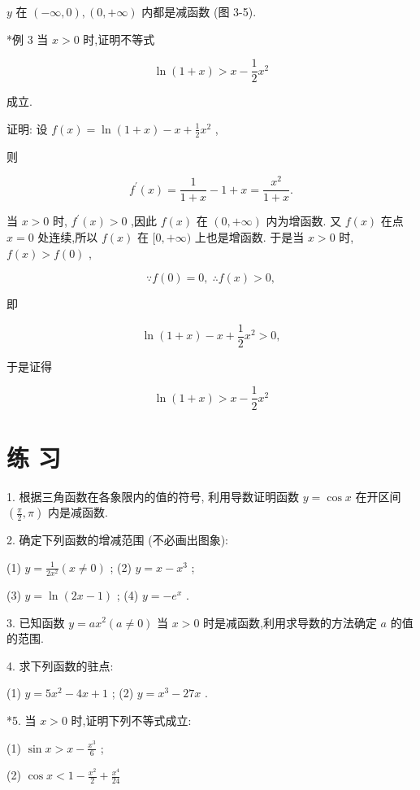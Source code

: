 \documentclass[10pt]{article}
\begin{document}
\(y\) 在 \(\left( {-\infty ,0}\right) ,\left( {0, + \infty }\right)\) 内都是减函数 (图 3-5).

*例 3 当 \(x > 0\) 时,证明不等式

\[
\ln \left( {1 + x}\right) > x - \frac{1}{2}{x}^{2}
\]

成立.

证明: 设 \(f\left( x\right) = \ln \left( {1 + x}\right) - x + \frac{1}{2}{x}^{2}\) ,

则

\[
{f}^{\prime }\left( x\right) = \frac{1}{1 + x} - 1 + x = \frac{{x}^{2}}{1 + x}.
\]

当 \(x > 0\) 时, \({f}^{\prime }\left( x\right) > 0\) ,因此 \(f\left( x\right)\) 在 \(\left( {0, + \infty }\right)\) 内为增函数. 又 \(f\left( x\right)\) 在点 \(x = 0\) 处连续,所以 \(f\left( x\right)\) 在 \(\lbrack 0, + \infty )\) 上也是增函数. 于是当 \(x > 0\) 时, \(f\left( x\right) > f\left( 0\right)\) ,

\[
\because f\left( 0\right) = 0,\;\therefore f\left( x\right) > 0,
\]

即

\[
\ln \left( {1 + x}\right) - x + \frac{1}{2}{x}^{2} > 0,
\]

于是证得

\[
\ln \left( {1 + x}\right) > x - \frac{1}{2}{x}^{2}
\]

\section*{练 习}

1. 根据三角函数在各象限内的值的符号, 利用导数证明函数 \(y = \cos x\) 在开区间 \(\left( {\frac{\pi }{2},\pi }\right)\) 内是减函数.

2. 确定下列函数的增减范围 (不必画出图象):

(1) \(y = \frac{1}{2{x}^{2}}\left( {x \neq 0}\right)\) ; (2) \(y = x - {x}^{3}\) ;

(3) \(y = \ln \left( {{2x} - 1}\right)\) ; (4) \(y = - {e}^{x}\) .

3. 已知函数 \(y = a{x}^{2}\left( {a \neq 0}\right)\) 当 \(x > 0\) 时是减函数,利用求导数的方法确定 \(a\) 的值的范围.

4. 求下列函数的驻点:

(1) \(y = 5{x}^{2} - {4x} + 1\) ; (2) \(y = {x}^{3} - {27x}\) .

*5. 当 \(x > 0\) 时,证明下列不等式成立:

(1) \(\sin x > x - \frac{{x}^{3}}{6}\) ;

(2) \(\cos x < 1 - \frac{{x}^{2}}{2} + \frac{{x}^{4}}{24}\)
\end{document}
